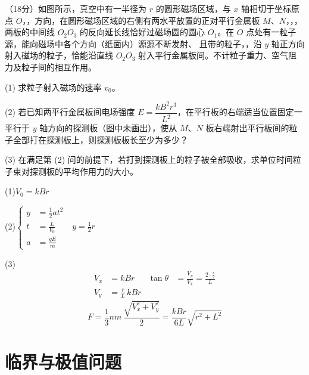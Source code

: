 \begin{problem}
（18分）如图所示，真空中有一半径为 $r$ 的圆形磁场区域，与 $x$ 轴相切于坐标原点 $O$，，方向，在圆形磁场区域的右侧有两水平放置的正对平行金属板 $M$、$N$，，，两板的中间线 $O_2O_3$ 的反向延长线恰好过磁场圆的圆心 $O_1$。在 $O$ 点处有一粒子源，能向磁场中各个方向（纸面内）源源不断发射、 且带的粒子，，沿 $y$ 轴正方向射入磁场的粒子，恰能沿直线 $O_2O_3$ 射入平行金属板间。不计粒子重力、空气阻力及粒子间的相互作用。

(1) 求粒子射入磁场的速率 $v_0$。

(2) 若已知两平行金属板间电场强度 $E=\dfrac{kB^2r^3}{L^2}$，在平行板的右端适当位置固定一平行于 $y$ 轴方向的探测板（图中未画出），使从 $M$、$N$ 板右端射出平行板间的粒子全部打在探测板上，则探测板板长至少为多少？

(3) 在满足第 (2) 问的前提下，若打到探测板上的粒子被全部吸收，求单位时间粒子束对探测板的平均作用力的大小。

\begin{solution}
(1)\quad $V_0=kBr$

(2)\quad $\left\{\begin{aligned} y&=\tfrac12at^2\\ t&=\tfrac{L}{V_0}\qquad y=\tfrac12r\\ a&=\tfrac{qE}{m}\end{aligned}\right.$

(3)
\begin{align*}
V_x&=kBr & \tan\theta&=\frac{V_y}{V_x}=\frac{2\cdot\frac{r}{2}}{L}\\
V_y&=\frac{r}{L}\,kBr
\end{align*}
\[ F=\frac13nm\,\frac{\sqrt{V_x^2+V_y^2}}{2}=\frac{kBr}{6L}\sqrt{r^2+L^2} \]
\end{solution}
\end{problem}


\section{临界与极值问题}

